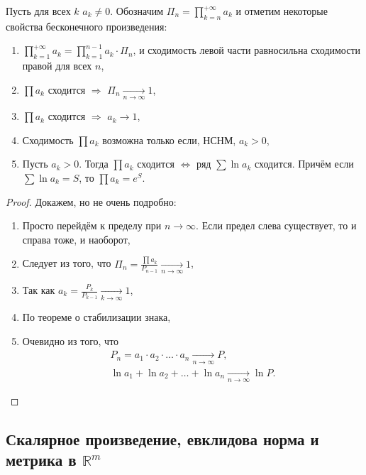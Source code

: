 \begin{remark} \hypertarget{besk}{}
	Пусть для всех \(k\) \(a_k \neq 0\). Обозначим \(\Pi_n = \prod\limits_{k=n}^{+\infty} a_k\) и отметим некоторые свойства бесконечного произведения:
	\begin{enumerate}
		\item \(\prod\limits_{k=1}^{+\infty} a_k = \prod\limits_{k=1}^{n-1} a_k \cdot \Pi_n\), и сходимость левой части равносильна сходимости правой для всех \(n\),
		\item \(\prod a_k\) сходится \(\Rightarrow\) \(\Pi_n \xrightarrow[n \to \infty]{} 1\),
		\item \(\prod a_k\) сходится \(\Rightarrow\) \(a_k \to 1\),
		\item Сходимость \(\prod a_k\) возможна только если, НСНМ, \(a_k > 0\),
		\item Пусть \(a_k > 0\). Тогда \(\prod a_k\) сходится \(\Leftrightarrow\) ряд \(\sum \ln a_k\) сходится. Причём если \(\sum \ln a_k = S\), то \(\prod a_k = e^S\).
	\end{enumerate}
\end{remark}
\begin{proof}
	Докажем, но не очень подробно:
	\begin{enumerate}
		\item Просто перейдём к пределу при \(n \to \infty\). Если предел слева существует, то и справа тоже, и наоборот,
		\item Следует из того, что \(\Pi_n = \frac{\prod a_k}{P_{n-1}} \xrightarrow[n \to \infty]{} 1\),
		\item Так как \(a_k = \frac{P_k}{P_{k-1}} \xrightarrow[k \to \infty]{} 1\),
		\item По теореме о стабилизации знака,
		\item Очевидно из того, что 
		\begin{gather*}
			P_n = a_1 \cdot a_2 \cdot \ldots \cdot a_n \xrightarrow[n \to \infty]{} P, \\
			\ln a_1 + \ln a_2 + \ldots + \ln a_n \xrightarrow[n \to \infty]{} \ln P.
		\end{gather*}
	\end{enumerate}
\end{proof}

\subsection{Скалярное произведение, евклидова норма и метрика в \(\mathbb{R}^m\)}

